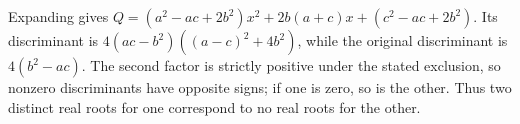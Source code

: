 Expanding gives $Q=(a^2-ac+2b^2)x^2+2b(a+c)x+(c^2-ac+2b^2)$. Its discriminant is $4(ac-b^2)((a-c)^2+4b^2)$, while the original discriminant is $4(b^2-ac)$. The second factor is strictly positive under the stated exclusion, so nonzero discriminants have opposite signs; if one is zero, so is the other. Thus two distinct real roots for one correspond to no real roots for the other.
